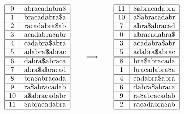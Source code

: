 \documentclass{article}
\begin{document}
\begin{figure}[H]
    \[
        \begin{tabular}{|c|c|}
            \hline
            0 & abracadabra\$ \\ \hline
            1 & bracadabra\$a \\ \hline
            2 & racadabra\$ab \\ \hline
            3 & acadabra\$abr \\ \hline
            4 & cadabra\$abra \\ \hline
            5 & adabra\$abrac \\ \hline
            6 & dabra\$abraca \\ \hline
            7 & abra\$abracad \\ \hline
            8 & bra\$abracada \\ \hline
            9 & ra\$abracadab \\ \hline
            10 & a\$abracadabr \\ \hline
            11 & \$abracadabra \\ \hline
        \end{tabular}
        \qquad \longrightarrow \qquad
        \begin{tabular}{|c|c|}
            \hline
            11 & \$abracadabra \\ \hline
            10 & a\$abracadabr \\ \hline
            7 & abra\$abracad \\ \hline
            0 & abracadabra\$ \\ \hline
            3 & acadabra\$abr \\ \hline
            5 & adabra\$abrac \\ \hline
            8 & bra\$abracada \\ \hline
            1 & bracadabra\$a \\ \hline
            4 & cadabra\$abra \\ \hline
            6 & dabra\$abraca \\ \hline
            9 & ra\$abracadab \\ \hline
            2 & racadabra\$ab \\ \hline
        \end{tabular}
    \]
\end{figure}
\end{document}
